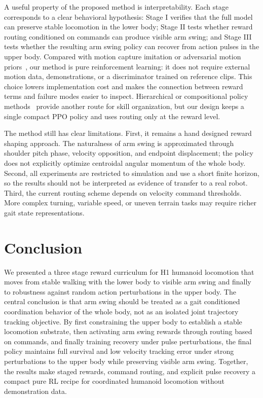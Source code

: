 \documentclass{article}
\begin{document}
A useful property of the proposed method is interpretability. Each stage corresponds to a clear behavioral hypothesis: Stage I verifies that the full model can preserve stable locomotion in the lower body; Stage II tests whether reward routing conditioned on commands can produce visible arm swing; and Stage III tests whether the resulting arm swing policy can recover from action pulses in the upper body. Compared with motion capture imitation or adversarial motion priors~\cite{peng2021amp}, our method is pure reinforcement learning: it does not require external motion data, demonstrations, or a discriminator trained on reference clips. This choice lowers implementation cost and makes the connection between reward terms and failure modes easier to inspect. Hierarchical or compositional policy methods~\cite{peng2019mcp} provide another route for skill organization, but our design keeps a single compact PPO policy and uses routing only at the reward level.

The method still has clear limitations. First, it remains a hand designed reward shaping approach. The naturalness of arm swing is approximated through shoulder pitch phase, velocity opposition, and endpoint displacement; the policy does not explicitly optimize centroidal angular momentum of the whole body. Second, all experiments are restricted to simulation and use a short finite horizon, so the results should not be interpreted as evidence of transfer to a real robot. Third, the current routing scheme depends on velocity command thresholds. More complex turning, variable speed, or uneven terrain tasks may require richer gait state representations.

\section{Conclusion}

We presented a three stage reward curriculum for H1 humanoid locomotion that moves from stable walking with the lower body to visible arm swing and finally to robustness against random action perturbations in the upper body. The central conclusion is that arm swing should be treated as a gait conditioned coordination behavior of the whole body, not as an isolated joint trajectory tracking objective. By first constraining the upper body to establish a stable locomotion substrate, then activating arm swing rewards through routing based on commands, and finally training recovery under pulse perturbations, the final policy maintains full survival and low velocity tracking error under strong perturbations to the upper body while preserving visible arm swing. Together, the results make staged rewards, command routing, and explicit pulse recovery a compact pure RL recipe for coordinated humanoid locomotion without demonstration data.

\end{document}
